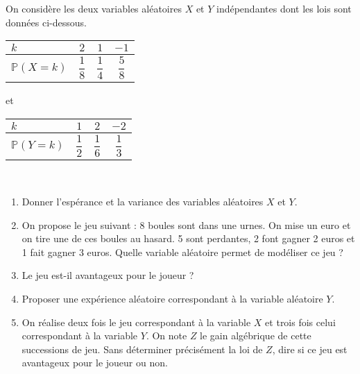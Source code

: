 \documentclass[11pt,fleqn, openany]{book} %
\begin{document}
\begin{exercise}On considère les deux variables aléatoires $X$ et $Y$ indépendantes dont les lois sont données ci-dessous.

\renewcommand{\arraystretch}{2.2}
\hfill
\begin{tabular}{|l|c|c|c|}
\hline
$k$ & $2$& $1$ & $-1$  \\
\hline
$\mathbb{P}(X=k)$ & $\dfrac{1}{8}$ & $\dfrac{1}{4}$ & $\dfrac{5}{8}$ \\
\hline \end{tabular}\hfill
et
\hfill
\begin{tabular}{|l|c|c|c|}
\hline
$k$ & $1$& $2$ & $-2$ \\
\hline
$\mathbb{P}(Y=k)$ & $\dfrac{1}{2}$ & $\dfrac{1}{6}$ & $\dfrac{1}{3}$ \\
\hline \end{tabular}\hfill~

\begin{enumerate}
\item Donner l'espérance et la variance des variables aléatoires $X$ et $Y$.
\item On propose le jeu suivant : 8 boules sont dans une urnes. On mise un euro et on tire une de ces boules au hasard. 5 sont perdantes, 2 font gagner 2 euros et 1 fait gagner 3 euros. Quelle variable aléatoire permet de modéliser ce jeu ?
\item Le jeu est-il avantageux pour le joueur ?
\item Proposer une expérience aléatoire correspondant à la variable aléatoire $Y$.
\item On réalise deux fois le jeu correspondant à la variable $X$ et trois fois celui correspondant à la variable $Y$. On note $Z$ le gain algébrique de cette successions de jeu. Sans déterminer précisément la loi de $Z$, dire si ce jeu est avantageux pour le joueur ou non.
\end{enumerate}\end{exercise}
\end{document}
